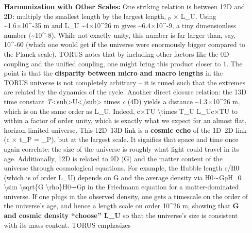 \documentclass[
]{article}
\begin{document}
\textbf{Harmonization with Other Scales:} One striking relation is
between 12D and 2D: multiply the smallest length by the largest length,
\emph{\ell}ₚ × L\_U. Using  \textasciitilde1.6×10\^{}-35 m and L\_U
\textasciitilde4×10\^{}26 m gives \textasciitilde6.4×10\^{}-9, a tiny
dimensionless number (\textasciitilde10\^{}-8)\hspace{0pt}. While not
exactly unity, this number is far larger than, say, 10\^{}-60 (which one
would get if the universe were enormously bigger compared to the Planck
scale). TORUS notes that by including other factors like the 0D coupling
and the unified coupling, one might bring this product closer to
1\hspace{0pt}. The point is that the \textbf{disparity between micro and
macro lengths} in the TORUS universe is not completely arbitrary -- it
is tuned such that the extremes are related by the dynamics of the
cycle\hspace{0pt}. Another direct closure relation: the 13D time
constant \emph{T}\textless sub\textgreater U\textless/sub\textgreater{}
times \emph{c} (4D) yields a distance \textasciitilde1.3×10\^{}26 m,
which is on the same order as L\_U\hspace{0pt}. Indeed, c×TU\approxLUc
\textbackslash times T\_U \approx L\_Uc×TU\hspace{0pt}\approxLU\hspace{0pt} to
within a factor of order unity, which is exactly what we expect for an
almost flat, horizon-limited universe. This 12D--13D link is a
\textbf{cosmic echo} of the 1D--2D link (c × t\_P = \ell\_P), but at the
largest scale\hspace{0pt}. It signifies that space and time once again
correlate: the size of the universe is roughly what light could travel
in its age. Additionally, 12D is related to 9D (G) and the matter
content of the universe through cosmological equations. For example, the
Hubble length c/H0 (which is of order L\_U) depends on G and the average
density via H0∼GρH\_0 \textbackslash sim \textbackslash sqrt\{G
\textbackslash rho\}H0\hspace{0pt}∼Gρ\hspace{0pt} in the Friedmann
equation for a matter-dominated universe\hspace{0pt}. If one plugs in
the observed density, one gets a timescale on the order of the
universe's age, and hence a length scale on order 10\^{}26 m, showing
that \textbf{G and cosmic density ``choose'' L\_U} so that the
universe's size is consistent with its mass content. TORUS emphasizes
\end{document}
